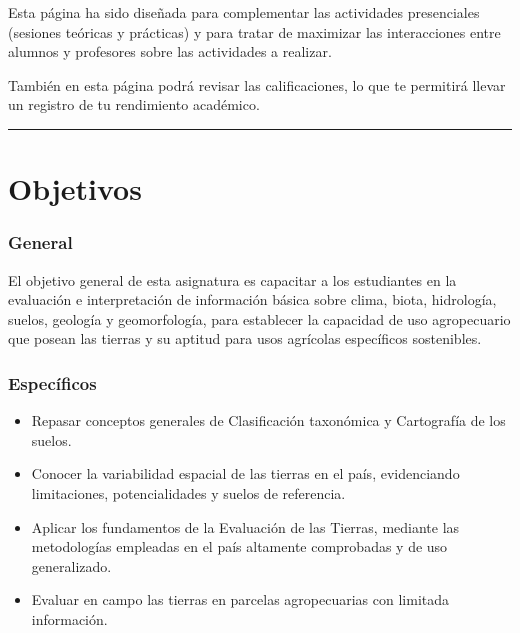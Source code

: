 \documentclass[
]{book}
\providecommand{\tightlist}{%
  \setlength{\itemsep}{0pt}\setlength{\parskip}{0pt}}
\begin{document}
Esta página ha sido diseñada para complementar las actividades presenciales (sesiones teóricas y prácticas) y para tratar de maximizar las interacciones entre alumnos y profesores sobre las actividades a realizar.

También en esta página podrá revisar las calificaciones, lo que te permitirá llevar un registro de tu rendimiento académico.

\begin{center}\rule{0.5\linewidth}{0.5pt}\end{center}

\hypertarget{objetivos}{%
\section*{Objetivos}\label{objetivos}}

\hypertarget{general}{%
\subsubsection*{General}\label{general}}

El objetivo general de esta asignatura es capacitar a los estudiantes en la evaluación e interpretación de información básica sobre clima, biota, hidrología, suelos, geología y geomorfología, para establecer la capacidad de uso agropecuario que posean las tierras y su aptitud para usos agrícolas específicos sostenibles.

\hypertarget{especuxedficos}{%
\subsubsection*{Específicos}\label{especuxedficos}}

\begin{itemize}
\tightlist
\item
  Repasar conceptos generales de Clasificación taxonómica y Cartografía de los suelos.
\item
  Conocer la variabilidad espacial de las tierras en el país, evidenciando limitaciones, potencialidades y suelos de referencia.
\item
  Aplicar los fundamentos de la Evaluación de las Tierras, mediante las metodologías empleadas en el país altamente comprobadas y de uso generalizado.
\item
  Evaluar en campo las tierras en parcelas agropecuarias con limitada información.
\end{itemize}
\end{document}
